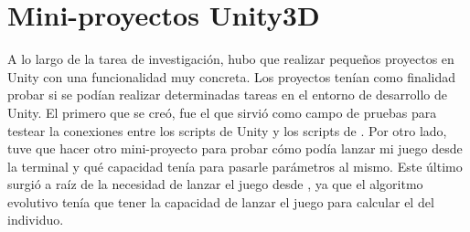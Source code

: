 \section{Mini-proyectos Unity3D}

A lo largo de la tarea de investigación, hubo que realizar pequeños proyectos en Unity con una funcionalidad muy concreta. Los proyectos tenían como finalidad probar si se podían realizar determinadas tareas en el entorno de desarrollo de Unity. El primero que se creó, fue el que sirvió como campo de pruebas para testear la conexiones entre los scripts de Unity y los scripts de . Por otro lado, tuve que hacer otro mini-proyecto para probar cómo podía lanzar mi juego desde la terminal y qué capacidad tenía para pasarle parámetros al mismo. Este último surgió a raíz de la necesidad de lanzar el juego desde , ya que el algoritmo evolutivo tenía que tener la capacidad de lanzar el juego para calcular el  del individuo.